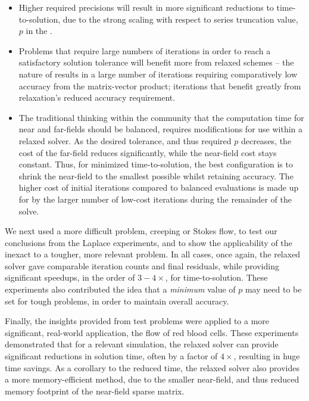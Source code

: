 \begin{itemize}
\item Higher required precisions will result in more significant reductions to time-to-solution, due to the strong scaling with respect to series truncation value, $p$ in the {\fmm}.

\item Problems that require large numbers of iterations in order to reach a satisfactory solution tolerance will benefit more from relaxed schemes -- the nature of {\gmres} results in a large number of iterations requiring comparatively low accuracy from the matrix-vector product; iterations that benefit greatly from relaxation's reduced accuracy requirement.

\item The traditional thinking within the {\fmm} community that the computation time for near and far-fields should be balanced, requires modifications for use within a relaxed solver. As the desired tolerance, and thus required $p$ decreases, the cost of the far-field reduces significantly, while the near-field cost stays constant. Thus, for minimized time-to-solution, the best configuration is to shrink the near-field to the smallest possible whilst retaining accuracy. The higher cost of initial iterations compared to balanced evaluations is made up for by the larger number of low-cost iterations during the remainder of the solve.
\end{itemize}

We next used a more difficult problem, creeping or Stokes flow, to test our conclusions from the Laplace experiments, and to show the applicability of the inexact {\gmres} to a tougher, more relevant problem. In all cases, once again, the relaxed solver gave comparable iteration counts and final residuals, while providing significant speedups, in the order of $3-4\times$, for time-to-solution. These experiments also contributed the idea that a \emph{minimum} value of $p$ may need to be set for tough problems, in order to maintain overall accuracy. 

Finally, the insights provided from test problems were applied to a more significant, real-world application, the flow of red blood cells. These experiments demonstrated that for a relevant simulation, the relaxed {\gmres} solver can provide significant reductions in solution time, often by a factor of $4\times$, resulting in huge time savings. As a corollary to the reduced time, the relaxed solver also provides a more memory-efficient method, due to the smaller near-field, and thus reduced memory footprint of the near-field sparse matrix.

